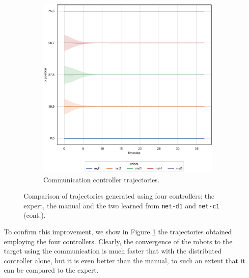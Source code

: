 \begin{figure}[!htb]
\begin{center}
\begin{subfigure}[h]{0.49\textwidth}
			\includegraphics[width=\textwidth]{contents/images/net-c1/position-overtime-learned_communication}
			\caption{Communication controller trajectories.}
		\end{subfigure}
	\end{center}
	\vspace{-0.5cm}
	\caption[]{Comparison of trajectories generated using four controllers: the 
	expert, the manual and the two learned from \texttt{net-d1} and 
	\texttt{net-c1} (cont.).}
	\label{fig:net-c1traj}
\end{figure}
To confirm this improvement, we show in Figure \ref{fig:net-c1traj} the 
trajectories obtained employing the four controllers. 
Clearly, the convergence of the robots to the target using the communication is 
much faster that with the distributed controller alone, but it is even better than 
the manual, to such an extent that it can be compared to the expert.

